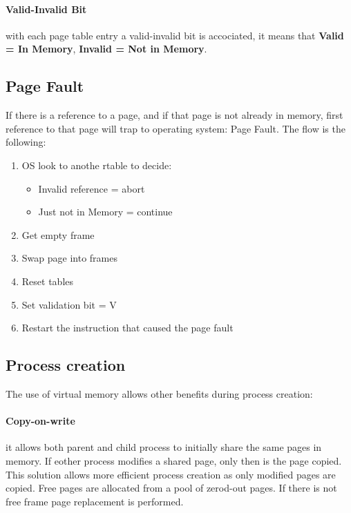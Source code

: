 \documentclass[12pt]{article}
\begin{document}
\paragraph{Valid-Invalid Bit} with each page table entry a valid-invalid bit is accociated, it means that \textbf{Valid = In Memory}, \textbf{Invalid = Not in Memory}.

\subsection{Page Fault}
If there is a reference to a page, and if that page is not already in memory, first reference to that page will trap to operating system: Page Fault. The flow is the following:
\begin{enumerate}
  \item OS look to anothe rtable to decide:
  \begin{itemize}
    \item Invalid reference = abort
    \item Just not in Memory = continue
  \end{itemize}
  \item Get empty frame
  \item Swap page into frames
  \item Reset tables
  \item Set validation bit = V
  \item Restart the instruction that caused the page fault
\end{enumerate}

\subsection{Process creation}
The use of virtual memory allows other benefits during process creation:
\paragraph{Copy-on-write} it allows both parent and child process to initially share the same pages in memory. If eother process modifies a shared page, only then is the page copied. This solution allows more efficient process creation as only modified pages are copied. Free pages are allocated from a pool of zerod-out pages. If there is not free frame page replacement is performed.\\
\end{document}
